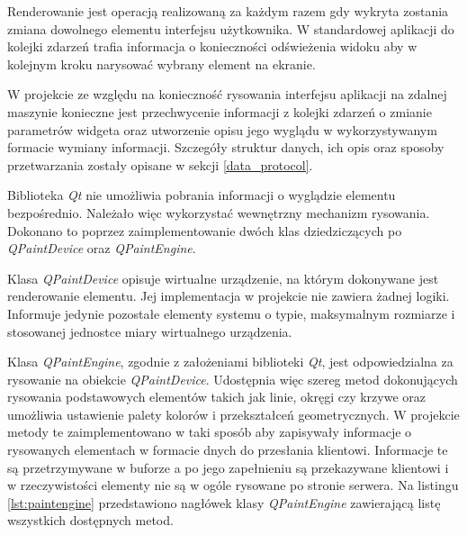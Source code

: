 Renderowanie jest operacją realizowaną za każdym razem gdy wykryta zostania zmiana dowolnego elementu interfejsu użytkownika. W standardowej aplikacji do kolejki zdarzeń trafia informacja o konieczności odświeżenia widoku aby w kolejnym kroku narysować wybrany element na ekranie. 

W projekcie ze względu na konieczność rysowania interfejsu aplikacji na zdalnej maszynie konieczne jest przechwycenie informacji z kolejki zdarzeń o zmianie parametrów widgeta oraz utworzenie opisu jego wyglądu w wykorzystywanym formacie wymiany informacji. Szczegóły struktur danych, ich opis oraz sposoby przetwarzania zostały opisane w sekcji \ref{data_protocol}.

Biblioteka \emph{Qt} nie umożliwia pobrania informacji o wyglądzie elementu bezpośrednio. Należało więc wykorzystać wewnętrzny mechanizm rysowania. Dokonano to poprzez zaimplementowanie dwóch klas dziedziczących po \emph{QPaintDevice} oraz \emph{QPaintEngine}. 

Klasa \emph{QPaintDevice} opisuje wirtualne urządzenie, na którym dokonywane jest renderowanie elementu. Jej implementacja w projekcie nie zawiera żadnej logiki. Informuje jedynie pozostałe elementy systemu o typie, maksymalnym rozmiarze i stosowanej jednostce miary wirtualnego urządzenia. 

Klasa \emph{QPaintEngine}, zgodnie z założeniami biblioteki \emph{Qt}, jest odpowiedzialna za rysowanie na obiekcie \emph{QPaintDevice}. Udostępnia więc szereg metod dokonujących rysowania podstawowych elementów takich jak linie, okręgi czy krzywe oraz umożliwia ustawienie palety kolorów i przekształceń geometrycznych. W projekcie metody te zaimplementowano w taki sposób aby zapisywały informacje o rysowanych elementach w formacie dnych do przesłania klientowi. Informacje te są przetrzymywane w buforze a po jego zapełnieniu są przekazywane klientowi i w rzeczywistości elementy nie są w ogóle rysowane po stronie serwera. Na listingu \ref{lst:paintengine} przedstawiono nagłówek klasy \emph{QPaintEngine} zawierającą listę wszystkich dostępnych metod.

